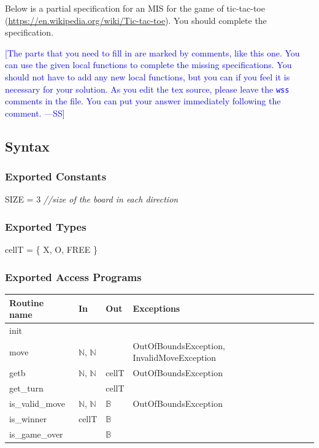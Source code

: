 \documentclass[12pt,fleqn]{examtst}
\newcommand{\authornote}[3]{\textcolor{#1}{[#3 ---#2]}}
\newcommand{\authornote}[3]{}
\newcommand{\wss}[1]{\authornote{blue}{SS}{#1}}
\begin{document}

\newpage

 Below is a partial specification for an MIS for the game of
tic-tac-toe (\url{https://en.wikipedia.org/wiki/Tic-tac-toe}).  You should
complete the specification.

\bigskip

\wss{The parts that you need to fill in are marked by comments, like this one.
  You can use the given local functions to complete the missing specifications.
  You should not have to add any new local functions, but you can if you feel it
  is necessary for your solution.  As you edit the tex source, please leave the
  \texttt{wss} comments in the file.  You can put your answer immediately
  following the comment.}

\subsection* {Syntax}

\subsubsection* {Exported Constants}

SIZE = 3 {\it //size of the board in each direction}\\

\subsubsection* {Exported Types}

cellT = \{ X, O, FREE \} \\

\subsubsection* {Exported Access Programs}

\begin{tabular}{| l | l | l | p{7cm} |}
\hline
\textbf{Routine name} & \textbf{In} & \textbf{Out} & \textbf{Exceptions}\\
\hline
init & ~ & ~ & ~\\
\hline
move & $\mathbb{N}$, $\mathbb{N}$ & ~ & OutOfBoundsException, InvalidMoveException\\
\hline
getb & $\mathbb{N}$, $\mathbb{N}$ & cellT & OutOfBoundsException\\
\hline
get\_turn & ~ & cellT & ~\\
\hline
is\_valid\_move & $\mathbb{N}$, $\mathbb{N}$ & $\mathbb{B}$ & OutOfBoundsException\\
\hline
is\_winner & cellT & $\mathbb{B}$ & ~\\
\hline
is\_game\_over & ~ & $\mathbb{B}$ & ~\\
\hline

\end{tabular}
\end{document}

